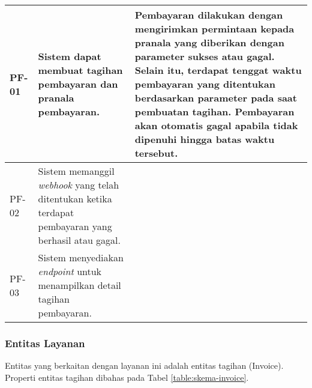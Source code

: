 \begin{longtable}{|l|p{}|p{}|}
    \hline
    \endlastfoot

    \hline
    PF-01       & Sistem dapat membuat tagihan pembayaran dan pranala pembayaran.                                              & Pembayaran dilakukan dengan mengirimkan permintaan kepada pranala yang diberikan dengan parameter sukses atau gagal. Selain itu, terdapat tenggat waktu pembayaran yang ditentukan berdasarkan parameter pada saat pembuatan tagihan. Pembayaran akan otomatis gagal apabila tidak dipenuhi hingga batas waktu tersebut. \\
    \hline
    PF-02       & Sistem memanggil \textit{webhook} yang telah ditentukan ketika terdapat pembayaran yang berhasil atau gagal. &                                                                                                                                                                                                                                                                                                                          \\
    \hline
    PF-03       & Sistem menyediakan \textit{endpoint} untuk menampilkan detail tagihan pembayaran.                            &                                                                                                                                                                                                                                                                                                                          \\
\end{longtable}
\endgroup

\subsubsection{Entitas Layanan}

Entitas yang berkaitan dengan layanan ini adalah entitas tagihan (Invoice). Properti entitas tagihan dibahas pada Tabel \ref{table:skema-invoice}.

\pagebreak

